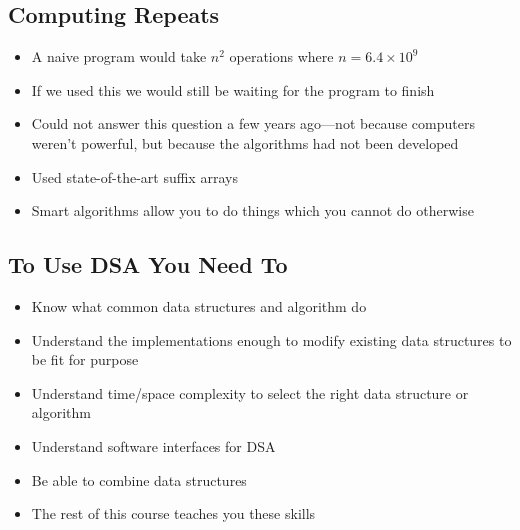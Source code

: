 \begin{slide}
\section{Computing Repeats}

\begin{PauseHighLight}
  \begin{itemize}
  \item A naive program would take $n^2$ operations where
    $n=6.4\times10^9$\pause
  \item If we used this we would still be waiting for the program to
    finish\pause
  \item Could not answer this question a few years ago\pause---not
    because computers weren't powerful, but because the algorithms had
    not been developed\pauseb
  \item Used state-of-the-art suffix arrays\pause
  \item Smart algorithms allow you to do things which you cannot do
    otherwise\pause
  \end{itemize}
\end{PauseHighLight}

\end{slide}



\begin{slide}
\section[-1]{To Use DSA You Need To}

\begin{PauseHighLight}
  \begin{itemize}
  \item Know what common data structures and algorithm do\pause
  \item Understand the implementations enough to modify existing data
    structures to be fit for purpose\pause
  \item Understand time/space complexity to select the right data
    structure or algorithm\pause
  \item Understand software interfaces for DSA\pause
  \item Be able to combine data structures\pause
  \item The rest of this course teaches you these skills\pause
\end{itemize}
\end{PauseHighLight}
\end{slide}
